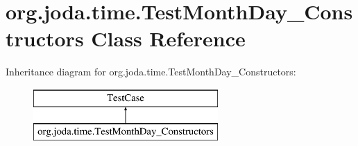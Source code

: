 \hypertarget{classorg_1_1joda_1_1time_1_1_test_month_day___constructors}{\section{org.\-joda.\-time.\-Test\-Month\-Day\-\_\-\-Constructors Class Reference}
\label{classorg_1_1joda_1_1time_1_1_test_month_day___constructors}
}
Inheritance diagram for org.\-joda.\-time.\-Test\-Month\-Day\-\_\-\-Constructors\-:\begin{figure}[H]
\begin{center}
\leavevmode
\includegraphics[height=2.000000cm]{classorg_1_1joda_1_1time_1_1_test_month_day___constructors}
\end{center}
\end{figure}
